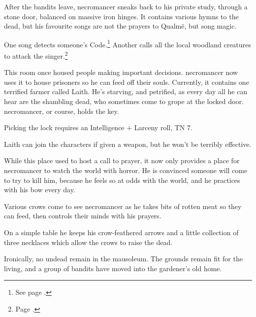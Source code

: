 \begin{multicols}{2}

After the bandits leave, \gls{necromancer} sneaks back to his private study, through a stone door, balanced on massive iron hinges.  It contains various hymns to the dead, but his favourite songs are not the prayers to Qualm\"{e}, but song magic.

One song detects someone's Code.\footnote{See page \pageref{chokingsong}.}
Another calls all the local woodland creatures to attack the singer.\footnote{Page \pageref{medalofheroism}.}


This room once housed people making important decisions.  \Gls{necromancer} now uses it to house prisoners so he can feed off their souls.
Currently, it contains one terrified farmer called Laith.
He's starving, and petrified, as every day all he can hear are the shambling dead, who sometimes come to grope at the locked door.
\Gls{necromancer}, or course, holds the key.

Picking the lock requires an Intelligence + Larceny roll, TN 7.

Laith can join the characters if given a weapon, but he won't be terribly effective.



While this place used to host a call to prayer, it now only provides a place for \gls{necromancer} to watch the world with horror.  He is convinced someone will come to try to kill him, because he feels so at odds with the world, and he practices with his bow every day.

Various crows come to see \gls{necromancer} as he takes bits of rotten meat so they can feed, then controls their minds with his prayers.

On a simple table he keeps his crow-feathered arrows and a little collection of three necklaces which allow the crows to raise the dead.


\thenecromancer


Ironically, no undead remain in the mausoleum.  The grounds remain fit for the living, and a group of bandits have moved into the gardener's old home.


\end{multicols}
